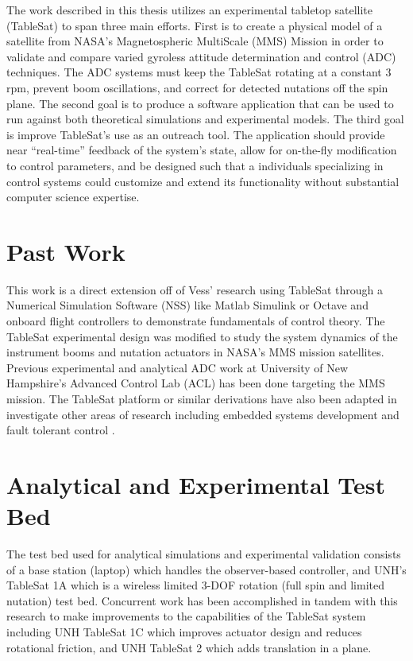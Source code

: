 The work described in this thesis utilizes an experimental tabletop satellite (TableSat) \cite{vessthesis} to span three main efforts.  First is to create a physical model of a satellite from NASA's Magnetospheric MultiScale (MMS) Mission in order to validate and compare varied gyroless attitude determination and control (ADC) techniques.  The ADC systems must keep the TableSat rotating at a constant 3 rpm, prevent boom oscillations, and correct for detected nutations off the spin plane.  The second goal is to produce a software application that can be used to run against both theoretical simulations and experimental models.  The third goal is improve TableSat's use as an outreach tool.  The application should provide near ``real-time'' feedback of the system's state, allow for on-the-fly modification to control parameters, and be designed such that a individuals specializing in control systems could customize and extend its functionality without substantial computer science expertise.

\section{Past Work}
\label{sec:PastWork}

This work is a direct extension off of Vess' \cite{vessthesis} research using TableSat through a Numerical Simulation Software (NSS) like Matlab Simulink or Octave and onboard flight controllers to demonstrate fundamentals of control theory.  The TableSat experimental design was modified to study the system dynamics of the instrument booms and nutation actuators in NASA's MMS mission satellites.  Previous experimental \cite{tsat1b} \cite{tsat1c} \cite{tsat2} and analytical \cite{mushawehthesis} ADC work at University of New Hampshire's Advanced Control Lab (ACL) has been done targeting the MMS mission.  The TableSat platform or similar derivations have also been adapted in investigate other areas of research including embedded systems development \cite{tablesat_xuml} and fault tolerant control \cite{tablesat_object_bench} \cite{nanjing_university}.


\section{Analytical and Experimental Test Bed}
\label{sec:AnalyticalandExperimentalTestbed}

The test bed used for analytical simulations and experimental validation consists of a base station (laptop) which handles the observer-based controller, and UNH's TableSat 1A which is a wireless limited 3-DOF rotation (full spin and limited nutation) test bed.  Concurrent work has been accomplished in tandem with this research to make improvements to the capabilities of the TableSat system including UNH TableSat 1C \cite{tsat1c} which improves actuator design and reduces rotational friction, and UNH TableSat 2 \cite{tsat2} which adds translation in a plane.

